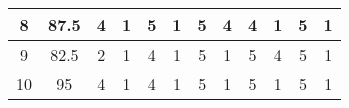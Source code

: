 \documentclass[12pt,a4paper]{report}
\begin{document}
\begin{sidewaystable}
\begin{tabular}{|c|c|c|c|c|c|c|c|c|c|c|c|}
8                                                               & {\color[HTML]{EA4335} 87.5}                                                          & 4                                                            & 1                                                            & 5                                                            & 1                                                            & 5                                                            & 4                                                            & 4                                                            & 1                                                            & 5                                                            & 1                                                             \\ \hline
9                                                               & {\color[HTML]{EA4335} 82.5}                                                          & 2                                                            & 1                                                            & 4                                                            & 1                                                            & 5                                                            & 1                                                            & 5                                                            & 4                                                            & 5                                                            & 1                                                             \\ \hline
10                                                              & {\color[HTML]{EA4335} 95}                                                            & 4                                                            & 1                                                            & 4                                                            & 1                                                            & 5                                                            & 1                                                            & 5                                                            & 1                                                            & 5                                                            & 1                                                             \\ \hline

\end{tabular}
\end{sidewaystable}
\end{document}
